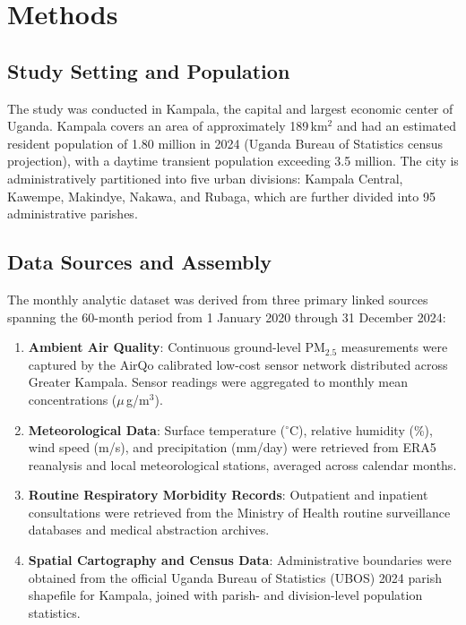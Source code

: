 \documentclass[12pt,a4paper]{report}
\newcommand{\pmfive}{PM$_{2.5}$}
\newcommand{\ugm}{\ensuremath{\mu}\,g/m$^3$}
\begin{document}
\chapter{Methods}
\section{Study Setting and Population}
The study was conducted in Kampala, the capital and largest economic center of Uganda. Kampala covers an area of approximately 189\,km$^2$ and had an estimated resident population of 1.80 million in 2024 (Uganda Bureau of Statistics census projection), with a daytime transient population exceeding 3.5 million. The city is administratively partitioned into five urban divisions: Kampala Central, Kawempe, Makindye, Nakawa, and Rubaga, which are further divided into 95 administrative parishes.

\section{Data Sources and Assembly}
The monthly analytic dataset was derived from three primary linked sources spanning the 60-month period from 1 January 2020 through 31 December 2024:
\begin{enumerate}[label=(\arabic*)]
    \item \textbf{Ambient Air Quality}: Continuous ground-level \pmfive{} measurements were captured by the AirQo calibrated low-cost sensor network distributed across Greater Kampala. Sensor readings were aggregated to monthly mean concentrations (\ugm{}).
    \item \textbf{Meteorological Data}: Surface temperature ($^\circ$C), relative humidity (\%), wind speed (m/s), and precipitation (mm/day) were retrieved from ERA5 reanalysis and local meteorological stations, averaged across calendar months.
    \item \textbf{Routine Respiratory Morbidity Records}: Outpatient and inpatient consultations were retrieved from the Ministry of Health routine surveillance databases and medical abstraction archives.
    \item \textbf{Spatial Cartography and Census Data}: Administrative boundaries were obtained from the official Uganda Bureau of Statistics (UBOS) 2024 parish shapefile for Kampala, joined with parish- and division-level population statistics.
\end{enumerate}
\end{document}
